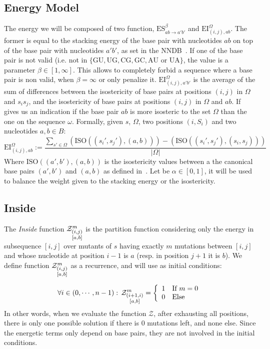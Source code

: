 \subsection{Energy Model}
The energy we will be composed of two function, $\text{ES}^{\beta}_{ab\to a'b'}$ and 
$\text{EI}^{\Omega}_{(i,j),ab}$. The former is equal to the 
stacking energy of the base pair with nucleotides $ab$ on top of the base pair with nucleotides 
$a'b'$, as set in the NNDB~\cite{Turner2010}. If one of the base pair is not valid (i.e. not in 
$\{\text{GU},\text{UG},\text{CG},\text{GC}, \text{AU or UA}\}$, the value is a parameter 
$\beta \in [1,\infty]$. This allows
to completely forbid a sequence where a base pair is non valid, when $\beta = \infty$ or only 
penalize it.
$\text{EI}^{\Omega}_{(i,j), a'b'}$ is the average of the sum of differences between the isostericity
of base pairs at positions $(i,j)$ in $\Omega$ and $s_is_j$, and the isostericity of base pairs
 at positions $(i,j)$ in $\Omega$ and $ab$. If gives us an indication 
 if the base pair $ab$ is more isosteric to the set $\Omega$ than the one on the sequence 
 $\omega$. Formally, given $s$, $\Omega$, two positions $(i,S_i)$ and two nucleotides $a,b\in B$:
 $$
 	\text{EI}^{\Omega}_{(i,j),ab}:=
	\frac{
		\displaystyle
		\sum_{s'\in\Omega}
		\left(
			\text{ISO}((s_i',s_j'),(a,b))
		\right)-
		\left(
			\text{ISO}((s_i',s_j'),(s_i,s_j))		
		\right)
	}{
		\displaystyle
		|\Omega|
	}
 $$
  Where $\text{ISO}((a',b'),(a,b))$ is the isostericity values 
 between a the canonical base pairs $(a',b')$ and $(a,b)$  as defined in~\cite{Stombaugh2009}. 
 Let be $\alpha\in[0,1]$, it 
 will be used to balance the weight given to the stacking energy or the isostericity.
	
\subsection{Inside}
The \emph{Inside} function $\Z{i,j}{m}{a,b}$ is the partition function considering only the 
energy in subsequence $[i,j]$ over mutants of $s$ having exactly $m$ mutations between $[i,j]$ and whose nucleotide at position $i-1$ is $a$ (resp. in position $j+1$ it is $b$).
We define function $\Z{i,j}{m}{a,b}$ as a recurrence, and will use as initial conditions:

\[
	\forall i \in (0,\cdots,n-1):\, \Z{i+1,i}{m}{a,b}=\left\{
	\begin{array}{ll}
		1 &\text{If } m = 0\\
		0 &\text{Else }
	\end{array}\right.
\]
In other words, when we evaluate the function $\mathcal Z$, after exhausting all positions, there 
is only one possible solution if there is $0$ mutations left, and none else. Since the 
energetic terms only depend on base pairs, they are not involved in the initial conditions. 

